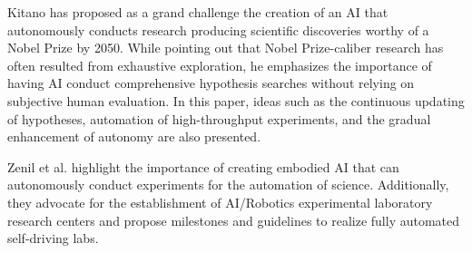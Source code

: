 Kitano \cite{kitano2021nobel} has proposed as a grand challenge the creation of an AI that autonomously conducts research producing scientific discoveries worthy of a Nobel Prize by 2050. While pointing out that Nobel Prize-caliber research has often resulted from exhaustive exploration, he emphasizes the importance of having AI conduct comprehensive hypothesis searches without relying on subjective human evaluation. In this paper, ideas such as the continuous updating of hypotheses, automation of high-throughput experiments, and the gradual enhancement of autonomy are also presented.

Zenil et al. \cite{zenil2023} highlight the importance of creating embodied AI that can autonomously conduct experiments for the automation of science. Additionally, they advocate for the establishment of AI/Robotics experimental laboratory research centers and propose milestones and guidelines to realize fully automated self-driving labs.

